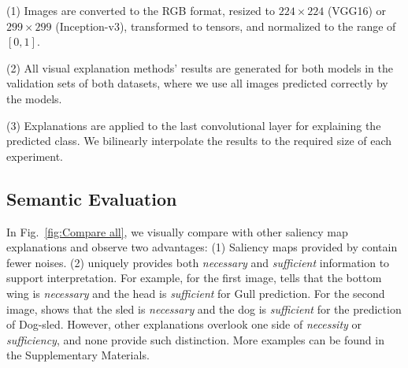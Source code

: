 \noindent(1) Images are converted to the RGB format, resized to $224\times224$ (VGG16) or $299\times299$ (Inception-v3), transformed to tensors, and normalized to the range of $[0,1]$.

\noindent(2) All visual explanation methods' results are generated for both models in the validation sets of both datasets, where we use all images predicted correctly by the models.

\noindent (3) Explanations are applied to the last convolutional layer for explaining the predicted class. We bilinearly interpolate the results to the required size of each experiment.

\subsection{Semantic Evaluation}

In Fig.~\ref{fig:Compare all}, we visually compare \name{} with other saliency map explanations and observe two advantages: 
(1) Saliency maps provided by \name{} contain fewer noises.
(2) \name{} uniquely provides both \textit{necessary} and \textit{sufficient} information to support interpretation. For example, for the first image, \name{} tells that the bottom wing is \textit{necessary} and the head is \textit{sufficient} for {\selectfont Gull} prediction. For the second image, \name{} shows that the sled is \textit{necessary} and the dog is \textit{sufficient} for the prediction of {\selectfont Dog-sled}.
However, other explanations overlook one side of \textit{necessity} or \textit{sufficiency}, and none provide such distinction.
More examples can be found in the Supplementary Materials.

